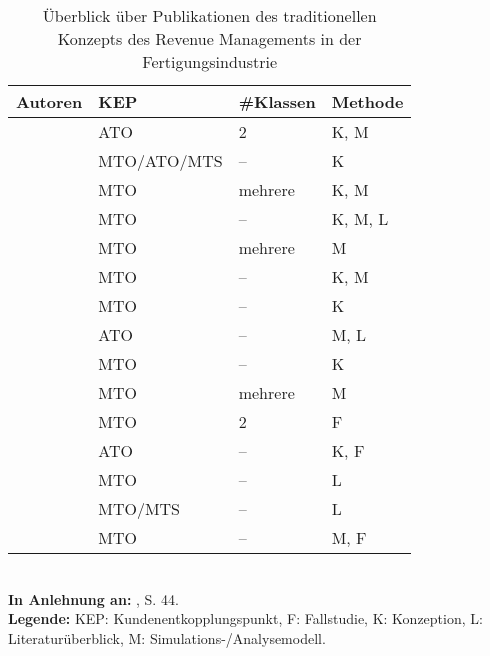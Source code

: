 \renewcommand{\arraystretch}{1.2}
\begin{table}[h!]
  \begin{center}
    \caption{Überblick über Publikationen des traditionellen Konzepts des Revenue Managements in der Fertigungsindustrie}  \label{Überblick}
    \vspace*{3mm}
    \begin{tabular}{llll}   %
     Autoren & KEP  & \#Klassen & Methode  \\ \hline
     \cite{deBHarris1995299} &      ATO          &  2  &  K, M \\
      \cite{Kalyan:2002aa}      &      MTO/ATO/MTS          &  --  &  K \\
                \cite{rehkopf:2005aa}   &      MTO          &  mehrere &  K, M \\
                      \cite{rehkopf2007revenue}    &      MTO          &  --  &  K, M, L \\
                               \cite{Spengler:2007aa}   &    MTO            & mehrere & M  \\
                               \cite{Volling20121021} & MTO & -- & K, M \\
          \cite{kimms2005branchenverg} & MTO & -- & K \\
          \cite{guhlich2015revenue} & ATO & -- & M, L \\
          \cite{kolisch2006revenue} & MTO & -- & K \\
              \cite{DECI:DECI074}  &      MTO          &  mehrere  &  M \\
          \cite{kuhn2004revenue} & MTO & 2 & F \\
        \cite{Specht:2008aa} &        ATO    &  --  & K, F  \\
        \cite{quante2009revenue} & MTO & -- & L \\ 
        \cite{cheraghi2010revenue} & MTO/MTS & -- & L \\
        \cite{sucky2009revenue} & MTO & -- & M, F \\ \hline
    \end{tabular} \\[3mm]
    {\footnotesize \textbf{In Anlehnung an:} \cite{quante2009management}, S. 44.}\\
        {\footnotesize \textbf{Legende:} KEP: Kundenentkopplungspunkt, F: Fallstudie, K: Konzeption, L: Literaturüberblick, M: Simulations-/Analysemodell. }   %
  \end{center}
\end{table}

